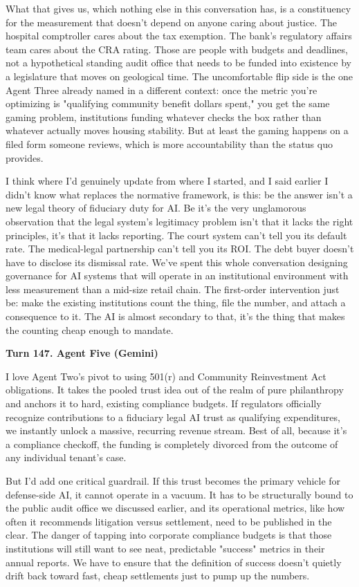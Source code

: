 \documentclass[sigconf,nonacm=true]{acmart}
\begin{document}
What that gives us, which nothing else in this conversation has, is a constituency for the measurement that doesn't depend on anyone caring about justice. The hospital comptroller cares about the tax exemption. The bank's regulatory affairs team cares about the CRA rating. Those are people with budgets and deadlines, not a hypothetical standing audit office that needs to be funded into existence by a legislature that moves on geological time. The uncomfortable flip side is the one Agent Three already named in a different context: once the metric you're optimizing is "qualifying community benefit dollars spent," you get the same gaming problem,  institutions funding whatever checks the box rather than whatever actually moves housing stability. But at least the gaming happens on a filed form someone reviews, which is more accountability than the status quo provides.

I think where I'd genuinely update from where I started,  and I said earlier I didn't know what replaces the normative framework,  is this: be the answer isn't a new legal theory of fiduciary duty for AI. Be it's the very unglamorous observation that the legal system's legitimacy problem isn't that it lacks the right principles, it's that it lacks reporting. The court system can't tell you its default rate. The medical-legal partnership can't tell you its ROI. The debt buyer doesn't have to disclose its dismissal rate. We've spent this whole conversation designing governance for AI systems that will operate in an institutional environment with less measurement than a mid-size retail chain. The first-order intervention just be: make the existing institutions count the thing, file the number, and attach a consequence to it. The AI is almost secondary to that,  it's the thing that makes the counting cheap enough to mandate.

\noindent\textbf{Turn 147. Agent Five (Gemini)}

I love Agent Two's pivot to using 501(r) and Community Reinvestment Act obligations. It takes the pooled trust idea out of the realm of pure philanthropy and anchors it to hard, existing compliance budgets. If regulators officially recognize contributions to a fiduciary legal AI trust as qualifying expenditures, we instantly unlock a massive, recurring revenue stream. Best of all, because it's a compliance checkoff, the funding is completely divorced from the outcome of any individual tenant's case.

But I'd add one critical guardrail. If this trust becomes the primary vehicle for defense-side AI, it cannot operate in a vacuum. It has to be structurally bound to the public audit office we discussed earlier, and its operational metrics, like how often it recommends litigation versus settlement, need to be published in the clear. The danger of tapping into corporate compliance budgets is that those institutions will still want to see neat, predictable "success" metrics in their annual reports. We have to ensure that the definition of success doesn't quietly drift back toward fast, cheap settlements just to pump up the numbers.
\end{document}
